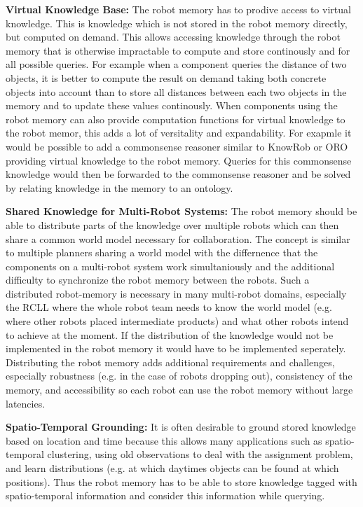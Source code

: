 \documentclass[a4paper,11pt]{article}
\begin{document}
\smallskip
\textbf{Virtual Knowledge Base:} The robot memory has to prodive
access to virtual knowledge. This is knowledge which is not stored in
the robot memory directly, but computed on demand. This allows
accessing knowledge through the robot memory that is otherwise
impractable to compute and store continously and for all possible
queries. For example when a component queries the distance of two
objects, it is better to compute the result on demand taking both
concrete objects into account than to store all distances between each
two objects in the memory and to update these values continously.
When components using the robot memory can also provide computation
functions for virtual knowledge to the robot memor, this adds a lot of
versitality and expandability. For exapmle it would be possible to add
a commonsense reasoner similar to KnowRob or ORO providing virtual
knowledge to the robot memory. Queries for this commonsense knowledge
would then be forwarded to the commonsense reasoner and be solved by
relating knowledge in the memory to an ontology.

\smallskip
\textbf{Shared Knowledge for Multi-Robot Systems:} The robot memory
should be able to distribute parts of the knowledge over multiple
robots which can then share a common world model necessary for
collaboration. The concept is similar to multiple planners sharing a
world model with the differnence that the components on a multi-robot
system work simultaniously and the additional difficulty to
synchronize the robot memory between the robots. Such a distributed
robot-memory is necessary in many multi-robot domains, especially the
RCLL where the whole robot team needs to know the world model
(e.g. where other robots placed intermediate products) and what other
robots intend to achieve at the moment. If the distribution of the
knowledge would not be implemented in the robot memory it would have
to be implemented seperately. Distributing the robot memory adds
additional requirements and challenges, especially robustness (e.g. in
the case of robots dropping out), consistency of the memory, and
accessibility so each robot can use the robot memory without large
latencies.

\smallskip
\textbf{Spatio-Temporal Grounding:} It is often desirable to ground
stored knowledge based on location and time because this allows many
applications such as spatio-temporal clustering, using old
observations to deal with the assignment problem, and learn
distributions (e.g. at which daytimes objects can be found at which
positions). Thus the robot memory has to be able to store knowledge
tagged with spatio-temporal information and consider this information
while querying.
\end{document}
